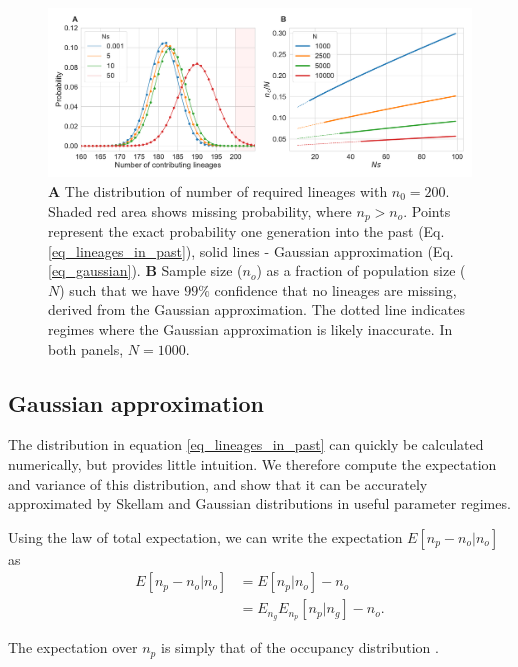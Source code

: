 \documentclass[review,nonatbib]{elsarticle}
\begin{document}
\begin{figure}
  \centering
  \includegraphics[width=\textwidth]{fig/combined.pdf}
  \caption{\textbf{A} The distribution of number of required lineages with $n_0=200$. Shaded
    red area shows missing probability, where $n_p > n_o$. Points represent the exact probability one
    generation into the past (Eq. \ref{eq_lineages_in_past}), solid lines - Gaussian approximation
    (Eq. \ref{eq_gaussian}). \textbf{B} Sample size ($n_o$) as a fraction of population size ($N$)
    such that we have $99\%$ confidence that no lineages are missing, derived from the Gaussian
    approximation. The dotted line indicates regimes where the Gaussian approximation is likely inaccurate. 
     In both panels, $N=1000$.}
  \label{fig_combined}
\end{figure}

\subsection{Gaussian approximation}
\label{subsec_gaussian}

The distribution in equation \ref{eq_lineages_in_past} can quickly be calculated numerically, but
provides little intuition. We therefore compute the
expectation and variance of this distribution, and show that it can be accurately approximated by
Skellam and Gaussian distributions in useful parameter regimes.

Using the law of total expectation, we can write the expectation $E[n_p-n_o | n_o]$ as 
\begin{equation*}
  \begin{aligned}
    \label{eq_lineages_approx}
    E[n_p-n_o | n_o] &=        E[n_p | n_o]       - n_o \\
                     &=E_{n_g} E_{n_p}[n_p | n_g] - n_o.
  \end{aligned}
\end{equation*}

The expectation over $n_p$ is simply that of the occupancy distribution \cite{Wakeley2009}.
\end{document}
